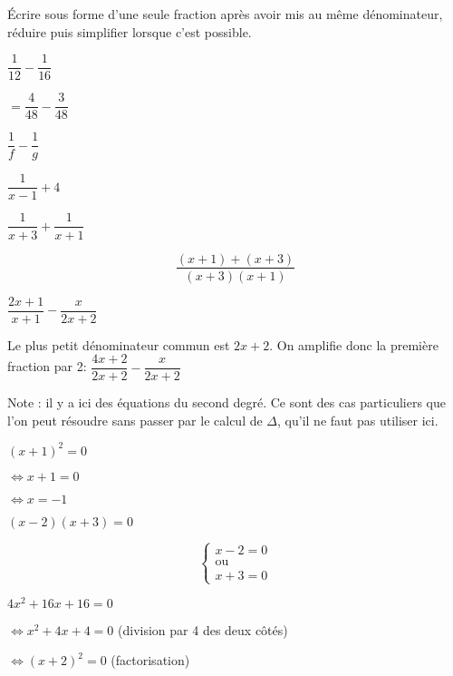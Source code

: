 \documentclass[a4paper,12pt]{scrartcl}
\begin{document}

Écrire sous forme d'une seule fraction après avoir mis au même dénominateur, réduire puis simplifier lorsque c'est possible.

\question{} $\dfrac{1}{12} - \dfrac{1}{16}$

$= \dfrac{4}{48} - \dfrac{3}{48}$


\question{} $\dfrac{1}{f} - \dfrac{1}{g}$


\question{} $\dfrac{1}{x-1} + 4$


\question{} $\dfrac{1}{x+3} + \dfrac{1}{x+1}$

$$\dfrac{(x+1)+(x+3)}{(x+3)(x+1)}$$


\question{} $\dfrac{2x+1}{x+1} - \dfrac{x}{2x+2}$

Le plus petit dénominateur commun est $2x+2$. On \og amplifie \fg{}  donc la première fraction par 2:
$\dfrac{4x+2}{2x+2} - \dfrac{x}{2x+2}$



Note : il y a ici des équations du second degré. Ce sont des cas particuliers que l'on peut résoudre sans passer par le calcul de $\Delta$, qu'il ne faut pas utiliser ici.

\question{} $(x+1)^{2} = 0$

$\Leftrightarrow x+1 = 0$

$\Leftrightarrow x = -1$


\question{} $(x-2)(x+3) = 0$



\[
\left\{ 
\begin{array}{c}
x-2 = 0 \\ 
\mbox{ou} \\ 
x+3 = 0
\end{array}
\right. 
\]


\question{} $4x^{2} + 16x + 16 = 0$

$\Leftrightarrow x^{2} + 4x + 4 = 0$ (division par 4 des deux côtés)

$\Leftrightarrow (x+2)^{2} = 0$ (factorisation)
\end{document}
